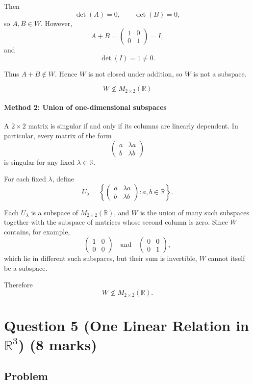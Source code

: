 \documentclass[12pt]{article}
\begin{document}
Then
\[
\det(A)=0,\qquad \det(B)=0,
\]
so \(A,B\in W\). However,
\[
A+B=\begin{pmatrix}1&0\\0&1\end{pmatrix}=I,
\]
and
\[
\det(I)=1\neq0.
\]

Thus \(A+B\notin W\). Hence \(W\) is not closed under addition, so \(W\) is not a subspace.

\[
\boxed{W\not\le M_{2\times2}(\mathbb R)}
\]

\paragraph{Method 2: Union of one-dimensional subspaces}

A \(2\times2\) matrix is singular if and only if its columns are linearly dependent. In particular, every matrix of the form
\[
\begin{pmatrix}a&\lambda a\\ b&\lambda b\end{pmatrix}
\]
is singular for any fixed \(\lambda\in\mathbb R\).

For each fixed \(\lambda\), define
\[
U_\lambda=\left\{
\begin{pmatrix}a&\lambda a\\ b&\lambda b\end{pmatrix}
: a,b\in\mathbb R
\right\}.
\]

Each \(U_\lambda\) is a subspace of \(M_{2\times2}(\mathbb R)\), and \(W\) is the union of many such subspaces together with the subspace of matrices whose second column is zero. Since \(W\) contains, for example,
\[
\begin{pmatrix}1&0\\0&0\end{pmatrix}
\quad\text{and}\quad
\begin{pmatrix}0&0\\0&1\end{pmatrix},
\]
which lie in different such subspaces, but their sum is invertible, \(W\) cannot itself be a subspace.

Therefore
\[
\boxed{W\not\le M_{2\times2}(\mathbb R)}.
\]

\newpage
\section{Question 5 (One Linear Relation in \(\mathbb R^3\)) \hfill (8 marks)}
\subsection{Problem}
\end{document}
